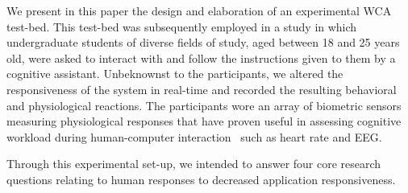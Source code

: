 \documentclass[10pt,letterpaper]{article}
\begin{document}
We present in this paper the design and elaboration of an experimental WCA test-bed.
This test-bed was subsequently employed in a study in which undergraduate students of diverse fields of study, aged between 18 and 25 years old, were asked to interact with and follow the instructions given to them by a cognitive assistant.
Unbeknownst to the participants, we altered the responsiveness of the system in real-time and recorded the resulting behavioral and physiological reactions. 
The participants wore an array of biometric sensors measuring physiological responses that have proven useful in assessing cognitive workload during human-computer interaction~\cite{haapalainen2010psycho,kumar2016measurement} such as heart rate and EEG.\@

Through this experimental set-up, we intended to answer four core research questions relating to human responses to decreased application responsiveness.
\end{document}
